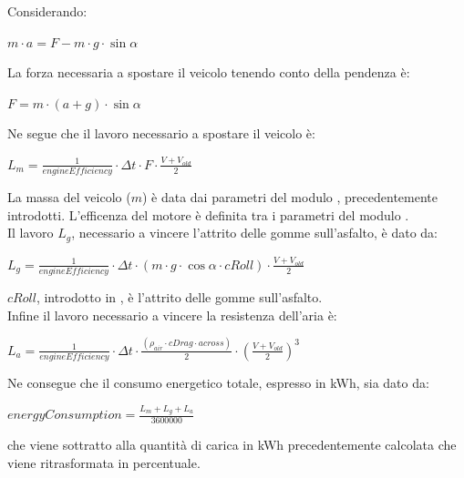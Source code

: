 \noindent
Considerando:

\begin{center}
	$\boxed{m \cdot a = F - m \cdot g \cdot \sin{\alpha} }$
\end{center}

\noindent
La forza necessaria a spostare il veicolo tenendo conto della pendenza è:

\begin{center}
	$\boxed{F = m \cdot (a + g) \cdot \sin{\alpha} }$
\end{center}

\noindent
Ne segue che il lavoro necessario a spostare il veicolo è:

\begin{center}
	$\boxed{L_m = \frac{1}{engineEfficiency} \cdot \Delta t \cdot F \cdot \frac{V + V_{old}}{2}}$
\end{center}

\noindent
La massa del veicolo ($m$) è data dai parametri del modulo , precedentemente introdotti. L'efficenza del motore è definita tra i parametri del modulo .
\\
\noindent
Il lavoro $L_g$, necessario a vincere l'attrito delle gomme sull'asfalto, è dato da:

\begin{center}
$\boxed{L_g = \frac{1}{engineEfficiency} \cdot \Delta t \cdot (m \cdot g \cdot \cos{\alpha} \cdot cRoll) \cdot \frac{V + V_{old}}{2}}$
\end{center}

\noindent
$cRoll$, introdotto in , è l'attrito delle gomme sull'asfalto.
\\
\noindent
Infine il lavoro necessario a vincere la resistenza dell'aria è:

\begin{center}
	$\boxed{L_a = \frac{1}{engineEfficiency} \cdot \Delta t \cdot \frac{(\rho_{air} \cdot cDrag \cdot across)}{2} \cdot 	(\frac{V + V_{old}}{2})^3}$
\end{center}

\noindent
Ne consegue che il consumo energetico totale, espresso in kWh, sia dato da:

\begin{center}
	$\boxed{energyConsumption = \frac{L_m + L_g + L_a}{3600000}}$
\end{center}

\noindent
che viene sottratto alla quantità di carica in kWh precedentemente calcolata che viene ritrasformata in percentuale.

